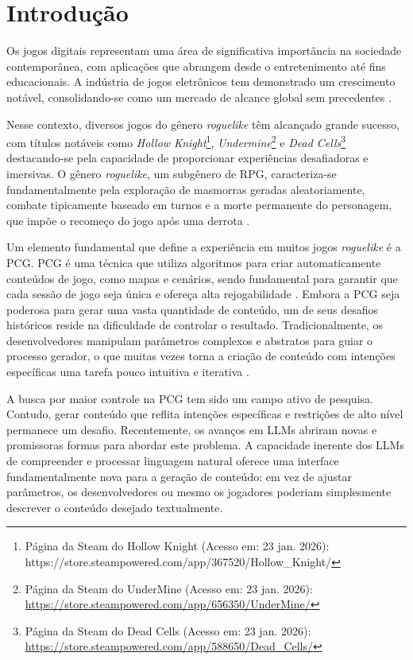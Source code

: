 \chapter{Introdução}
\label{cap:introducao}

Os jogos digitais representam uma área de significativa importância na sociedade
contemporânea, com aplicações que abrangem desde o entretenimento até fins
educacionais. A indústria de jogos eletrônicos tem demonstrado um crescimento
notável, consolidando-se como um mercado de alcance global sem precedentes
\cite{wijman2023newzoo}.

Nesse contexto, diversos jogos do gênero \textit{roguelike} têm alcançado grande
sucesso, com títulos notáveis como \textit{Hollow
    Knight}\footnote{Página da Steam do Hollow Knight (Acesso em: 23 jan. 2026): https://store.steampowered.com/app/367520/Hollow\_Knight/},
\textit{Undermine}\footnote{Página da Steam do UnderMine (Acesso em: 23 jan. 2026): \url{https://store.steampowered.com/app/656350/UnderMine/}}
e \textit{Dead
    Cells}\footnote{Página da Steam do Dead Cells (Acesso em: 23 jan. 2026): \url{https://store.steampowered.com/app/588650/Dead\_Cells/}}
destacando-se pela capacidade de proporcionar experiências desafiadoras e
imersivas. O gênero \textit{roguelike}, um subgênero de \gls{RPG},
caracteriza-se fundamentalmente pela exploração de masmorras geradas
aleatoriamente, combate tipicamente baseado em turnos e a morte permanente do
personagem, que impõe o recomeço do jogo após uma derrota
\cite{laurindo2024relatorio}.

Um elemento fundamental que define a experiência em muitos jogos
\textit{roguelike} é a \gls{PCG}. \gls{PCG} é uma técnica que utiliza algoritmos
para criar automaticamente conteúdos de jogo, como mapas e cenários, sendo
fundamental para garantir que cada sessão de jogo seja única e ofereça alta
rejogabilidade \cite{sepanmaa2024procedural}. Embora a \gls{PCG} seja poderosa para
gerar uma vasta quantidade de conteúdo, um de seus desafios históricos reside na
dificuldade de controlar o resultado. Tradicionalmente, os desenvolvedores
manipulam parâmetros complexos e abstratos para guiar o processo gerador, o que
muitas vezes torna a criação de conteúdo com intenções específicas uma tarefa
pouco intuitiva e iterativa \cite{lazaridis2024creating}.

A busca por maior controle na \gls{PCG} tem sido um campo ativo de
pesquisa.  Contudo, gerar conteúdo que reflita intenções específicas e
restrições de alto nível permanece um desafio. Recentemente, os avanços em
\gls{LLM}s abriram novas e promissoras formas para abordar este problema. A
capacidade inerente dos \gls{LLM}s de compreender e processar linguagem natural
oferece uma interface fundamentalmente nova para a geração de conteúdo: em vez
de ajustar parâmetros, os desenvolvedores ou mesmo os jogadores poderiam
simplesmente descrever o conteúdo desejado textualmente.

